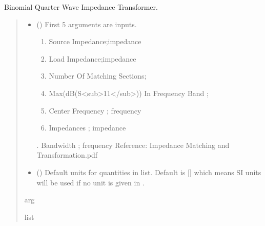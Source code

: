 \documentclass[letterpaper,10pt,english]{sphinxmanual}
\begin{document}

\begin{fulllineitems}
\label{\detokenize{components:components.Binomial_QWave_Impedance_Transformer}}
\pysigstartsignatures
{}
\pysigstopsignatures
\sphinxAtStartPar
Binomial Quarter Wave Impedance Transformer.
\begin{quote}\begin{description}
\begin{itemize}
\item {} 
\sphinxAtStartPar
{} () \textendash{} 
\sphinxAtStartPar
First 5 arguments are inputs.
\begin{enumerate}
%
\item {} 
\sphinxAtStartPar
Source Impedance;impedance

\item {} 
\sphinxAtStartPar
Load Impedance;impedance

\item {} 
\sphinxAtStartPar
Number Of Matching Sections;

\item {} 
\sphinxAtStartPar
Max(dB(S\textless{}sub\textgreater{}11\textless{}/sub\textgreater{})) In Frequency Band ;

\item {} 
\sphinxAtStartPar
Center Frequency ; frequency

\item {} 
\sphinxAtStartPar
Impedances ; impedance

\end{enumerate}

.  Bandwidth ; frequency
Reference:  Impedance Matching and Transformation.pdf


\item {} 
\sphinxAtStartPar
{} (\sphinxstyleliteralemphasis{\sphinxupquote{, }}) \textendash{} Default units for quantities in  list. Default is {[}{]} which means SI units will be used if no unit is given in .

\end{itemize}

\sphinxAtStartPar
arg

\sphinxAtStartPar
list

\end{description}\end{quote}

\end{fulllineitems}
\end{document}
